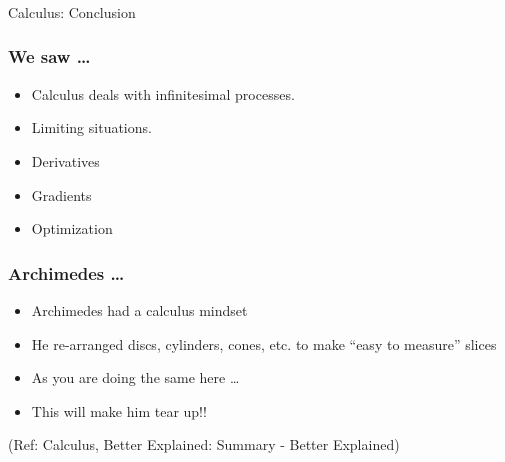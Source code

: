 \begin{frame}[fragile]\frametitle{}
\begin{center}
{\Large Calculus: Conclusion}
\end{center}
\end{frame}

 \begin{frame}[fragile]\frametitle{We saw \ldots}
\begin{itemize}
\item Calculus deals with infinitesimal processes.
\item Limiting situations.
\item Derivatives
\item Gradients
\item Optimization
\end{itemize}
\end{frame}

 \begin{frame}[fragile]\frametitle{Archimedes \ldots}
\begin{itemize}
\item Archimedes had a calculus mindset
\item He re-arranged discs, cylinders, cones, etc. to make ``easy to measure'' slices
\item As you are doing the same here \ldots
\item This will make him tear up!!
\end{itemize}


\tiny{(Ref: Calculus, Better Explained: Summary - Better Explained)}

\end{frame}

